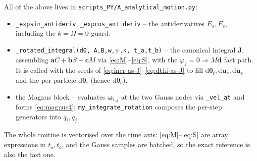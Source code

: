 \documentclass[11pt]{article}
\newcommand{\Om}{\Omega}
\newcommand{\bw}{\boldsymbol{\omega}}
\begin{document}
All of the above lives in \texttt{scripts\_PY/A\_analytical\_motion.py}:
\begin{itemize}
  \item \texttt{\_expsin\_antideriv}, \texttt{\_expcos\_antideriv} -- the antiderivatives
        $E_s,E_c$, including the $k=\Om=0$ guard.
  \item \texttt{\_rotated\_integral(d0, A,B,w,$\psi$,k, t\_a,t\_b)} -- the canonical
        integral $\mathbf{J}$, assembling $\mathbf a C+\mathbf b S+\mathbf c M$ via
        \eqref{eq:M}--\eqref{eq:S}, with the $\varphi_f=0\Rightarrow M\mathbf d$ fast path.
        It is called with the seeds of \eqref{eq:incr-as-J}--\eqref{eq:dthi-as-J} to fill
        $\mathrm{d}\boldsymbol\theta_t,\mathrm{d}\mathbf u_r,\mathrm{d}\mathbf u_s$ and the
        per-particle $\mathrm{d}\boldsymbol\theta_i$ (hence $\mathrm{d}\boldsymbol\theta_b$).
  \item the Magnus block -- evaluates $\bw_{i,j}$ at the two Gauss nodes via
        \texttt{\_vel\_at} and forms \eqref{eq:magnus4}; \texttt{my\_integrate\_rotation}
        composes the per-step generators into $q_i,q_j$.
\end{itemize}
The whole routine is vectorised over the time axis: \eqref{eq:M}--\eqref{eq:S} are array
expressions in $t_a,t_b$, and the Gauss samples are batched, so the exact reference is also
the fast one.
\end{document}
